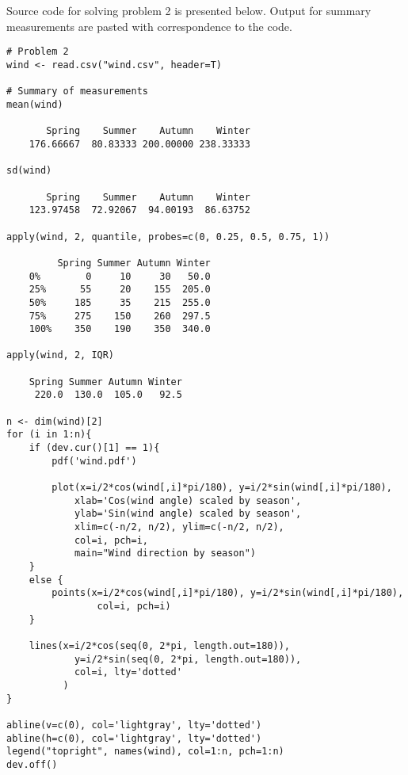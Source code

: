 \documentclass[letter]{article}
\begin{document}
    \section{}
    Source code for solving problem 2 is presented below. Output for summary measurements are pasted with correspondence to the code.

    \begin{verbatim}
# Problem 2
wind <- read.csv("wind.csv", header=T)

# Summary of measurements
mean(wind)

       Spring    Summer    Autumn    Winter 
    176.66667  80.83333 200.00000 238.33333 

sd(wind)

       Spring    Summer    Autumn    Winter 
    123.97458  72.92067  94.00193  86.63752 

apply(wind, 2, quantile, probes=c(0, 0.25, 0.5, 0.75, 1))

         Spring Summer Autumn Winter
    0%        0     10     30   50.0
    25%      55     20    155  205.0
    50%     185     35    215  255.0
    75%     275    150    260  297.5
    100%    350    190    350  340.0

apply(wind, 2, IQR)

    Spring Summer Autumn Winter 
     220.0  130.0  105.0   92.5

n <- dim(wind)[2]
for (i in 1:n){
    if (dev.cur()[1] == 1){
        pdf('wind.pdf')

        plot(x=i/2*cos(wind[,i]*pi/180), y=i/2*sin(wind[,i]*pi/180),
            xlab='Cos(wind angle) scaled by season', 
            ylab='Sin(wind angle) scaled by season',
            xlim=c(-n/2, n/2), ylim=c(-n/2, n/2),
            col=i, pch=i,
            main="Wind direction by season")
    }
    else {
        points(x=i/2*cos(wind[,i]*pi/180), y=i/2*sin(wind[,i]*pi/180),
                col=i, pch=i)
    }

    lines(x=i/2*cos(seq(0, 2*pi, length.out=180)),
            y=i/2*sin(seq(0, 2*pi, length.out=180)),
            col=i, lty='dotted'
          )
}

abline(v=c(0), col='lightgray', lty='dotted')
abline(h=c(0), col='lightgray', lty='dotted')
legend("topright", names(wind), col=1:n, pch=1:n)
dev.off()
    \end{verbatim}
\end{document}
